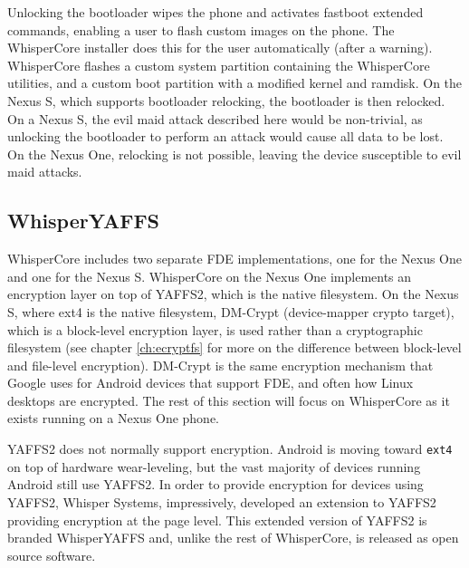 Unlocking the bootloader wipes the phone and activates fastboot extended commands, enabling a user to flash custom images on the
phone.  The WhisperCore installer does this for the user automatically (after a warning).  WhisperCore flashes a custom system
partition containing the WhisperCore utilities, and a custom boot partition with a modified kernel and ramdisk.  On the Nexus S,
which supports bootloader relocking, the bootloader is then relocked.  On a Nexus S, the evil maid attack described here would be
non-trivial, as unlocking the bootloader to perform an attack would cause all data to be lost.  On the Nexus One, relocking is not
possible, leaving the device susceptible to evil maid attacks. 

\subsection{WhisperYAFFS}
WhisperCore includes two separate FDE implementations, one for the Nexus One and one for the Nexus S. WhisperCore on the Nexus
One implements an encryption layer on top of YAFFS2, which is the native filesystem.  On the Nexus S, where ext4 is the native
filesystem, DM-Crypt (device-mapper crypto target), which is a block-level encryption layer, is used rather than a cryptographic
filesystem (see chapter \ref{ch:ecryptfs} for more on the difference between block-level and file-level encryption).  DM-Crypt is the
same encryption mechanism that Google uses for Android devices that support FDE, and often how Linux desktops are encrypted.  The
rest of this section will focus on WhisperCore as it exists running on a Nexus One phone.

YAFFS2 does not normally support encryption.  Android is moving toward \texttt{ext4} on top of hardware wear-leveling, but the vast
majority of devices running Android still use YAFFS2.  In order to provide encryption for devices using YAFFS2, Whisper Systems,
impressively, developed an extension to YAFFS2 providing encryption at the page level.  This extended version of YAFFS2 is branded
WhisperYAFFS and, unlike the rest of WhisperCore, is released as open source software.

